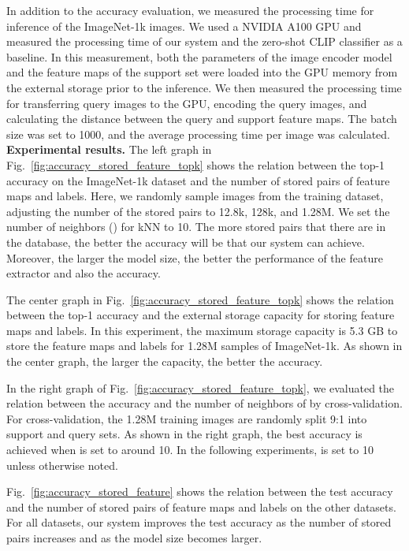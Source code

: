 \documentclass[runningheads]{llncs}
\begin{document}
In addition to the accuracy evaluation, we measured the processing time for inference of the ImageNet-1k images.
We used a NVIDIA A100 GPU and measured the processing time of our system and the zero-shot CLIP classifier as a baseline.
In this measurement, both the parameters of the image encoder model and the feature maps of the support set were loaded into the GPU memory from the external storage prior to the inference.
We then measured the processing time for transferring query images to the GPU, encoding the query images, and calculating the distance between the query and support feature maps.
The batch size was set to 1000, and the average processing time per image was calculated.\\


\noindent
\textbf{Experimental results.} The left graph in Fig.~\ref{fig:accuracy_stored_feature_topk} shows the relation between the top-1 accuracy on the ImageNet-1k dataset
and the number of stored pairs of feature maps and labels.
Here, we randomly sample images from the training dataset, adjusting the number of the stored pairs to 12.8k, 128k, and 1.28M.
We set the number of neighbors () for kNN to 10.
The more stored pairs that there are in the database, the better the accuracy will be that our system can achieve.
Moreover, the larger the model size, the better the performance of the feature extractor and also the accuracy.

The center graph in Fig.~\ref{fig:accuracy_stored_feature_topk} shows the relation between the top-1 accuracy and the external storage capacity for storing feature maps and labels.
In this experiment, the maximum storage capacity is 5.3 GB to store the feature maps and labels for 1.28M samples of ImageNet-1k.
As shown in the center graph, the larger the capacity, the better the accuracy.


In the right graph of Fig.~\ref{fig:accuracy_stored_feature_topk}, we evaluated the relation between the accuracy and the number of neighbors of  by cross-validation.
For cross-validation, the 1.28M training images are randomly split 9:1 into support and query sets. As shown in the right graph, the best accuracy is achieved when  is set to around 10.
In the following experiments,  is set to 10 unless otherwise noted.

Fig.~\ref{fig:accuracy_stored_feature} shows the relation between the test accuracy and the number of stored pairs of feature maps and labels on the other datasets.
For all datasets, our system improves the test accuracy as the number of stored pairs increases
and as the model size becomes larger.
\end{document}
